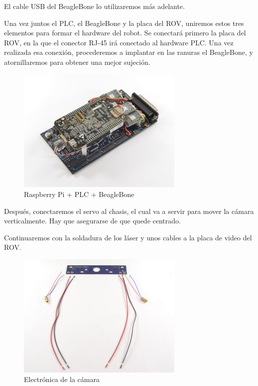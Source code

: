 El cable USB del BeagleBone lo utilizaremos más adelante.

Una vez juntos el PLC, el BeagleBone y la placa del ROV, uniremos estos tres elementos para formar el hardware del robot. Se conectará primero la placa del ROV, en la que el conector RJ-45 irá conectado al hardware PLC. Una vez realizada esa conexión, procederemos a implantar en las ranuras el BeagleBone, y atornillaremos para obtener una mejor sujeción.

\begin{figure} [hbtp]
  \begin{center}
    \includegraphics[width=8cm]{img/cap3/3_3/electronica}
  \end{center}
  \caption{Raspberry Pi + PLC + BeagleBone}
  \label{fig:electronica}
\end{figure}

Después, conectaremos el servo al chasis, el cual va a servir para mover la cámara verticalmente. Hay que asegurarse de que quede centrado.

Continuaremos con la soldadura de los láser y unos cables a la placa de video del ROV.

\begin{figure} [hbtp]
  \begin{center}
    \includegraphics[width=8cm]{img/cap3/3_3/electronica_camara}
  \end{center}
  \caption{Electrónica de la cámara}
  \label{fig:electronica_camara}
\end{figure}

